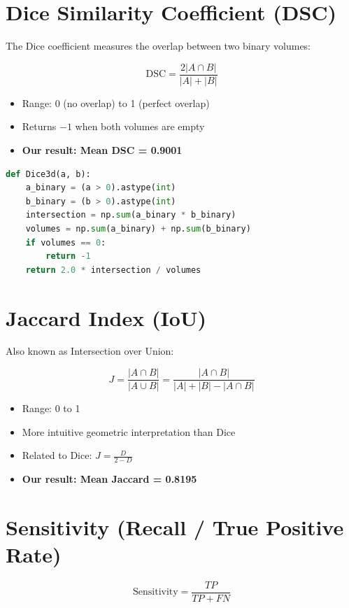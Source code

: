 \documentclass[12pt,a4paper]{report}
\begin{document}
\section{Dice Similarity Coefficient (DSC)}

The Dice coefficient measures the overlap between two binary volumes:

$$\text{DSC} = \frac{2|A \cap B|}{|A| + |B|}$$

\begin{itemize}
    \item Range: 0 (no overlap) to 1 (perfect overlap)
    \item Returns $-1$ when both volumes are empty
    \item \textbf{Our result: Mean DSC = 0.9001}
\end{itemize}

\begin{lstlisting}[language=Python, caption=Dice3d implementation]
def Dice3d(a, b):
    a_binary = (a > 0).astype(int)
    b_binary = (b > 0).astype(int)
    intersection = np.sum(a_binary * b_binary)
    volumes = np.sum(a_binary) + np.sum(b_binary)
    if volumes == 0:
        return -1
    return 2.0 * intersection / volumes
\end{lstlisting}

\section{Jaccard Index (IoU)}

Also known as Intersection over Union:

$$J = \frac{|A \cap B|}{|A \cup B|} = \frac{|A \cap B|}{|A| + |B| - |A \cap B|}$$

\begin{itemize}
    \item Range: 0 to 1
    \item More intuitive geometric interpretation than Dice
    \item Related to Dice: $J = \frac{D}{2-D}$
    \item \textbf{Our result: Mean Jaccard = 0.8195}
\end{itemize}

\section{Sensitivity (Recall / True Positive Rate)}

$$\text{Sensitivity} = \frac{TP}{TP + FN}$$
\end{document}
